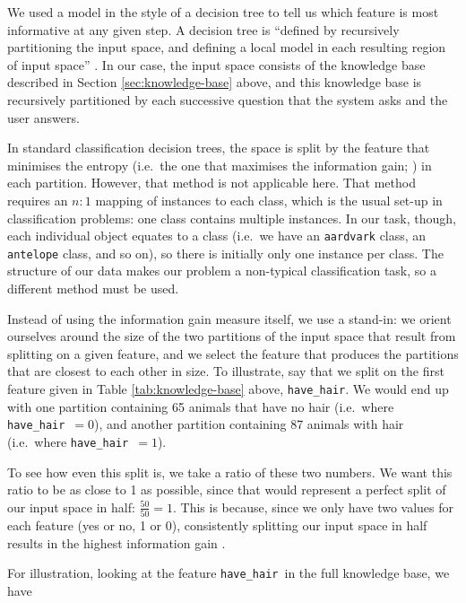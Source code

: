 \documentclass[11pt,a4paper]{article}
\newcommand{\havehair}{\texttt{have\_hair}}
\begin{document}
We used a model in the style of a decision tree to tell us which feature is most informative at any given step.
A decision tree is ``defined by recursively partitioning the input space, and defining a local model in each resulting region of input space'' \citep[545]{Murphy2012}.
In our case, the input space consists of the knowledge base described in Section \ref{sec:knowledge-base} above, and this knowledge base is recursively partitioned by each successive question that the system asks and the user answers.

In standard classification decision trees, the space is split by the feature that minimises the entropy (i.e.\ the one that maximises the information gain; \citealt{Quinlan1986}) in each partition.
However, that method is not applicable here.
That method requires an $n : 1$ mapping of instances to each class, which is the usual set-up in classification problems: one class contains multiple instances.
In our task, though, each individual object equates to a class (i.e.\ we have an \texttt{aardvark} class, an \texttt{antelope} class, and so on), so there is initially only one instance per class.
The structure of our data makes our problem a non-typical classification task, so a different method must be used.

Instead of using the information gain measure itself, we use a stand-in: we orient ourselves around the size of the two partitions of the input space that result from splitting on a given feature, and we select the feature that produces the partitions that are closest to each other in size.
To illustrate, say that we split on the first feature given in Table \ref{tab:knowledge-base} above, \havehair.
We would end up with one partition containing 65 animals that have no hair (i.e.\ where \havehair\ $= 0$), and another partition containing 87 animals with hair (i.e.\ where \havehair\ $= 1$).

To see how even this split is, we take a ratio of these two numbers.
We want this ratio to be as close to 1 as possible, since that would represent a perfect split of our input space in half: $\frac{50}{50} = 1$.
This is because, since we only have two values for each feature (yes or no, 1 or 0), consistently splitting our input space in half results in the highest information gain \citep[cf.][]{Quinlan1986, Bishop2006}.

For illustration, looking at the feature \havehair\ in the full knowledge base, we have
\end{document}

